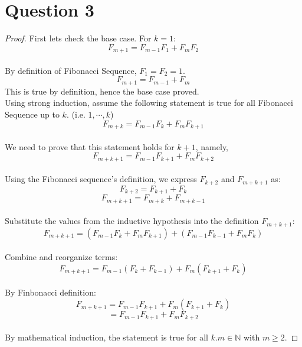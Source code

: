 \documentclass{article}
\begin{document}
\section*{Question 3}
\begin{proof}
    First lets check the base case. For $k = 1$:
    \[ F_{m + 1} = F_{m - 1}F_1 + F_m F_2 \]
    \\
    By definition of Fibonacci Sequence, $F_1 = F_2 = 1$.
    \[ F_{m + 1} = F_{m - 1} + F_m \]
    This is true by definition, hence the base case proved.
    \\
    Using strong induction, assume the following statement is true for all Fibonacci Sequence up to $k$. (i.e.  $1, \cdots, k$)
    \[ F_{m + k} = F_{m - 1}F_k + F_m F_{k + 1} \]
    \\
    We need to prove that this statement holds for $k+1$, namely,
    \[ F_{m + k + 1} = F_{m - 1}F_{k + 1} + F_m F_{k + 2} \]
    \\
    Using the Fibonacci sequence's definition, we express $F_{k+2}$ and $F_{m+k+1}$ as:
    \[ F_{k+2} = F_{k+1} + F_k \]
    \[ F_{m+k+1} = F_{m+k} + F_{m+k-1} \]
    \\
    Substitute the values from the inductive hypothesis into the definition $F_{m+k+1}$:
    \[ F_{m+k+1} = (F_{m-1}F_k + F_mF_{k+1}) + (F_{m-1}F_{k-1} + F_mF_k) \]
    \\
    Combine and reorganize terms:
    \[  F_{m+k+1} = F_{m-1}(F_k + F_{k-1}) + F_m(F_{k+1} + F_k) \]
    \\
    By Finbonacci definition:
    \[ F_{m+k+1} = F_{m-1}F_{k+1} + F_m(F_{k+1} + F_k) \]
    \[ =  F_{m-1}F_{k+1} + F_mF_{k+2} \]
    \\
    By mathematical induction, the statement is true for all $k.m \in \mathbb{N}$ with $m \geq 2$.
\end{proof}
\end{document}
